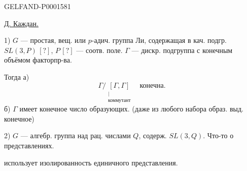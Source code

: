 \begin{GelfandAdjacentEvidence}{GELFAND-P000158}{1}
\hfill{}

\underline{Д. Каждан.} 

1) $G$ — простая, вещ. или $p$-адич. группа Ли, содержащая
в кач. подгр. $SL(3,P)\,[?]$, $P\,[?]$ — соотв. поле.
$\Gamma$ — дискр. подгруппа с конечным объёмом факторпр-ва.
\end{GelfandAdjacentEvidence}

Тогда а)
\begin{equation*}
\Gamma/\underset{\substack{\vert\\\text{коммутант}}}{[\Gamma,\Gamma]}\quad\text{конечна}.
\end{equation*}
б) $\Gamma$ имеет конечное число образующих.
(даже из любого набора образ. выд. конечное)


2) $G$ — алгебр. группа над рац. числами $Q$, содерж.
$SL(3,Q)$.
Что-то о представлениях.

 использует изолированность единичного представления.

